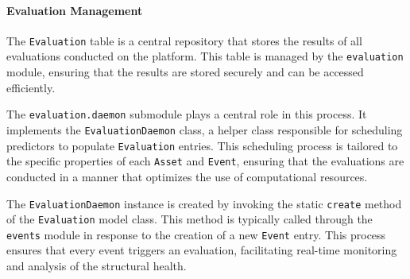 \paragraph{Evaluation Management}
The \texttt{Evaluation} table is a central repository that stores the results of all evaluations conducted on the platform. This table is managed by the \texttt{evaluation} module, ensuring that the results are stored securely and can be accessed efficiently.

The \texttt{evaluation.daemon} submodule plays a central role in this process. 
It implements the \texttt{EvaluationDaemon} class, a helper class responsible for scheduling \glspl{predictor} to populate \texttt{Evaluation} entries. 
This scheduling process is tailored to the specific properties of each \texttt{Asset} and \texttt{Event}, ensuring that the evaluations are conducted in a manner that optimizes the use of computational resources.

The \texttt{EvaluationDaemon} instance is created by invoking the static \texttt{create} method of the \texttt{Evaluation} model class. This method is typically called through the \texttt{events} module in response to the creation of a new \texttt{Event} entry. This process ensures that every \gls{event} triggers an evaluation, facilitating real-time monitoring and analysis of the structural health.
